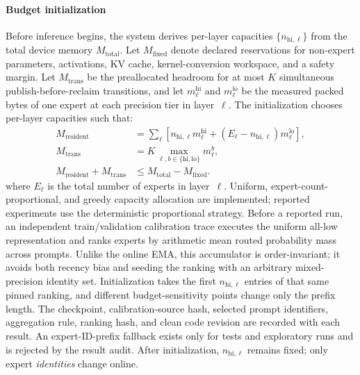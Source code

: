 \paragraph{Budget initialization}
Before inference begins, the system derives per-layer capacities $\{n_{\mathrm{hi},\ell}\}$ from the total device memory $M_{\text{total}}$. Let $M_{\text{fixed}}$ denote declared reservations for non-expert parameters, activations, KV cache, kernel-conversion workspace, and a safety margin. Let $M_{\text{trans}}$ be the preallocated headroom for at most $K$ simultaneous publish-before-reclaim transitions, and let $m^{\text{hi}}_\ell$ and $m^{\text{lo}}_\ell$ be the measured packed bytes of one expert at each precision tier in layer~$\ell$. The initialization chooses per-layer capacities such that:
\begin{equation}
\begin{aligned}
M_{\text{resident}}
&=\sum_{\ell}\!\left[n_{\mathrm{hi},\ell}m^{\text{hi}}_\ell+
(E_{\ell}-n_{\mathrm{hi},\ell})m^{\text{lo}}_\ell\right],\\
M_{\text{trans}}
&=K\max_{\ell,b\in\{\mathrm{hi},\mathrm{lo}\}}m^b_\ell,\\
M_{\text{resident}}+M_{\text{trans}}
&\le M_{\text{total}}-M_{\text{fixed}}.
\end{aligned}
\label{eq:device-memory-budget}
\end{equation}
where $E_\ell$ is the total number of experts in layer~$\ell$. Uniform, expert-count-proportional, and greedy capacity allocation are implemented; reported experiments use the deterministic proportional strategy. Before a reported run, an independent train/validation calibration trace executes the uniform all-low representation and ranks experts by arithmetic mean routed probability mass across prompts. Unlike the online EMA, this accumulator is order-invariant; it avoids both recency bias and seeding the ranking with an arbitrary mixed-precision identity set. Initialization takes the first $n_{\mathrm{hi},\ell}$ entries of that same pinned ranking, and different budget-sensitivity points change only the prefix length. The checkpoint, calibration-source hash, selected prompt identifiers, aggregation rule, ranking hash, and clean code revision are recorded with each result. An expert-ID-prefix fallback exists only for tests and exploratory runs and is rejected by the result audit. After initialization, $n_{\mathrm{hi},\ell}$ remains fixed; only expert \emph{identities} change online.

